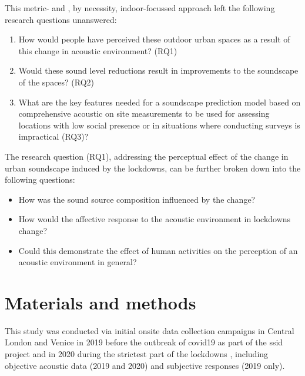  This metric- and , by necessity, indoor-focussed approach left the following research questions unanswered:

\begin{enumerate}
  \item How would people have perceived these outdoor urban spaces as a result of this change in acoustic environment? (RQ1)
  \item Would these sound level reductions result in improvements to the soundscape of the spaces? (RQ2)
  \item What are the key features needed for a soundscape prediction model based on comprehensive acoustic on site measurements to be used for assessing locations with low social presence or in situations where conducting surveys is impractical (RQ3)?
\end{enumerate}

The  research question (RQ1), addressing the perceptual effect of the change in urban soundscape induced by the lockdowns, can be further broken down into the following questions:

\begin{itemize}
  \item How was the sound source composition influenced by the change?
  \item How would the affective response to the acoustic environment in lockdowns change?
  \item Could this demonstrate the effect of human activities on the perception of an acoustic environment in general?
\end{itemize}


\section{Materials and methods}

 This study was conducted via initial onsite data collection campaigns in Central London and Venice in 2019 before the outbreak of \gls{covid19} as part of the \gls{ssid} project \citep{Mitchell2020Soundscape} and in 2020 during the strictest part of the lockdowns \citep{Aletta2020Assessing}, including objective acoustic data (2019 and 2020) and subjective responses (2019 only). 
 
